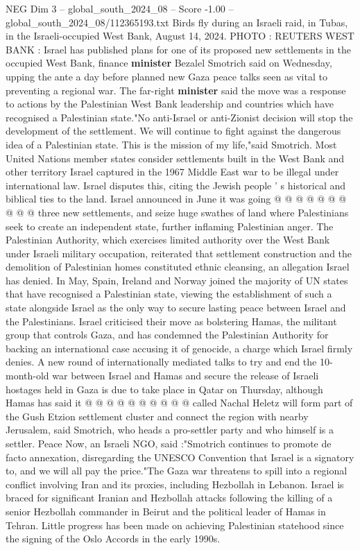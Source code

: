 \begin{textsample}{NEG Dim 3 – global\_south\_2024\_08 – Score -1.00 – global\_south\_2024\_08/112365193.txt}  \label{ex:f3_neg_155}
Birds fly during an Israeli raid, in Tubas, in the Israeli-occupied West Bank, August 14, 2024.
PHOTO : REUTERS WEST BANK : Israel has published plans for one of its proposed new settlements in the occupied West Bank, finance \textbf{minister} Bezalel Smotrich said on Wednesday, upping the ante a day before planned new Gaza peace talks seen as vital to preventing a regional war.
The far-right \textbf{minister} said the move was a response to actions by the Palestinian West Bank leadership and countries which have recognised a Palestinian state."No anti-Israel or anti-Zionist decision will stop the development of the settlement.
We will continue to fight against the dangerous idea of a Palestinian state.
This is the mission of my life,"said Smotrich.
Most United Nations member states consider settlements built in the West Bank and other territory Israel captured in the 1967 Middle East war to be illegal under international law.
Israel disputes this, citing the Jewish people ' s historical and biblical ties to the land.
Israel announced in June it was going @ @ @ @ @ @ @ @ @ @ three new settlements, and seize huge swathes of land where Palestinians seek to create an independent state, further inflaming Palestinian anger.
The Palestinian Authority, which exercises limited authority over the West Bank under Israeli military occupation, reiterated that settlement construction and the demolition of Palestinian homes constituted ethnic cleansing, an allegation Israel has denied.
In May, Spain, Ireland and Norway joined the majority of UN states that have recognised a Palestinian state, viewing the establishment of such a state alongside Israel as the only way to secure lasting peace between Israel and the Palestinians.
Israel criticised their move as bolstering Hamas, the militant group that controls Gaza, and has condemned the Palestinian Authority for backing an international case accusing it of genocide, a charge which Israel firmly denies.
A new round of internationally mediated talks to try and end the 10-month-old war between Israel and Hamas and secure the release of Israeli hostages held in Gaza is due to take place in Qatar on Thursday, although Hamas has said it @ @ @ @ @ @ @ @ @ @ called Nachal Heletz will form part of the Gush Etzion settlement cluster and connect the region with nearby Jerusalem, said Smotrich, who heads a pro-settler party and who himself is a settler.
Peace Now, an Israeli NGO, said :"Smotrich continues to promote de facto annexation, disregarding the UNESCO Convention that Israel is a signatory to, and we will all pay the price."The Gaza war threatens to spill into a regional conflict involving Iran and its proxies, including Hezbollah in Lebanon.
Israel is braced for significant Iranian and Hezbollah attacks following the killing of a senior Hezbollah commander in Beirut and the political leader of Hamas in Tehran.
Little progress has been made on achieving Palestinian statehood since the signing of the Oslo Accords in the early 1990s.

\end{textsample}
